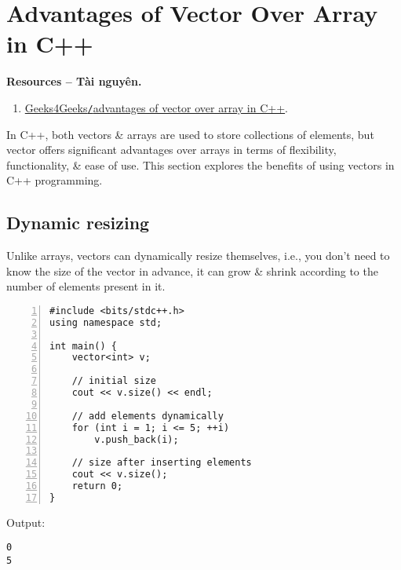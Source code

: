 \documentclass{article}
\begin{document}

\section{Advantages of Vector Over Array in C++}
\textbf{\textsf{Resources -- Tài nguyên.}}
\begin{enumerate}
	\item \href{https://www.geeksforgeeks.org/advantages-of-vector-over-array-in-c/}{Geeks4Geeks{\tt/}advantages of vector over array in C++}.
\end{enumerate}
In C++, both vectors \& arrays are used to store collections of elements, but vector offers significant advantages over arrays in terms of flexibility, functionality, \& ease of use. This section explores the benefits of using vectors in C++ programming.


\subsection{Dynamic resizing}
Unlike arrays, vectors can dynamically resize themselves, i.e., you don't need to know the size of the vector in advance, it can grow \& shrink according to the number of elements present in it.
\begin{Verbatim}[numbers=left,xleftmargin=5mm]
#include <bits/stdc++.h>
using namespace std;

int main() {
    vector<int> v;
	
    // initial size
    cout << v.size() << endl;
	
    // add elements dynamically
    for (int i = 1; i <= 5; ++i)
        v.push_back(i);
	
    // size after inserting elements
    cout << v.size();
    return 0;
}
\end{Verbatim}
Output:
\begin{verbatim}
0
5
\end{verbatim}

\end{document}
